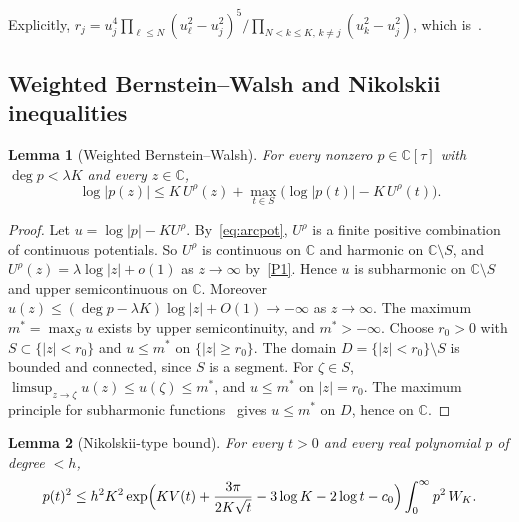 \documentclass[11pt]{article}
\newtheorem{lemma}{Lemma}
\theoremstyle{remark}
\newcommand{\C}{\mathbb{C}}
\begin{document}
Explicitly, $r_j=u_j^4\prod_{\ell\le N}(u_\ell^2-u_j^2)^5\big/\prod_{N<k\le K,\,k\ne j}(u_k^2-u_j^2)$, which is~\cite[(C.3)]{F}.

\subsection{Weighted Bernstein--Walsh and Nikolskii inequalities}

\begin{lemma}[Weighted Bernstein--Walsh]\label{lem:BW}
For every nonzero $p\in\C[\tau]$ with $\deg p<\lambda K$ and every $z\in\C$,
\[
\log|p(z)|\le K\,U^\rho(z)+\max_{t\in S}\bigl(\log|p(t)|-K\,U^\rho(t)\bigr).
\]
\end{lemma}

\begin{proof}
Let $u=\log|p|-KU^\rho$. By~\eqref{eq:arcpot}, $U^\rho$ is a finite positive combination of continuous potentials. So $U^\rho$ is continuous on $\C$ and harmonic on $\C\setminus S$, and $U^\rho(z)=\lambda\log|z|+o(1)$ as $z\to\infty$ by~\ref{P1}. Hence $u$ is subharmonic on $\C\setminus S$ and upper semicontinuous on $\C$. Moreover $u(z)\le(\deg p-\lambda K)\log|z|+O(1)\to-\infty$ as $z\to\infty$. The maximum $m^*=\max_Su$ exists by upper semicontinuity, and $m^*>-\infty$. Choose $r_0>0$ with $S\subset\{|z|<r_0\}$ and $u\le m^*$ on $\{|z|\ge r_0\}$. The domain $D=\{|z|<r_0\}\setminus S$ is bounded and connected, since $S$ is a segment. For $\zeta\in S$, $\limsup_{z\to\zeta}u(z)\le u(\zeta)\le m^*$, and $u\le m^*$ on $|z|=r_0$. The maximum principle for subharmonic functions~\cite[Thm.~2.3.1]{Ra} gives $u\le m^*$ on $D$, hence on $\C$.
\end{proof}

\begin{lemma}[Nikolskii-type bound]\label{lem:nik}
For every $t>0$ and every real polynomial $p$ of degree $<h$,
\[
p(t)^2\le h^2K^2\exp\Bigl(KV(t)+\frac{3\pi}{2K\sqrt t}-3\log K-2\log t-c_0\Bigr)\int_0^\infty p^2\,W_K .
\]
\end{lemma}
\end{document}
